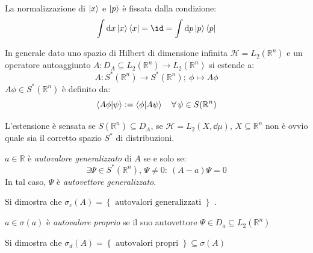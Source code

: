 \begin{remark}
    La normalizzazione di \(\ket{x}\) e \(\ket{p}\) è fissata dalla condizione:
    \begin{equation}
        \int \dd{x} \ket{x}\bra{x} = \id = \int \dd{p} \ket{p}\bra{p}
    \end{equation}

\end{remark}

In generale dato uno spazio di Hilbert di dimensione infinita \(\mathcal{H}= L_2(\mathbb{R}^n)\) e un operatore autoaggiunto \(A: D_A \subseteq L_2(\mathbb{R}^n)\to L_2(\mathbb{R}^n)\)
si estende a:
\begin{equation}
    A: S^*(\mathbb{R}^n)\to S^*(\mathbb{R}^n) ; \ \phi \mapsto A\phi
\end{equation}
\(A\phi \in S^*(\mathbb{R}^n)\) è definito da:
\[
    \braket{A\phi}{\psi}:=\braket{\phi}{A\psi} \quad \forall\, \psi \in S(\mathbb{R}^n)
\]
\begin{attention}
    L'estensione è sensata se \(S(\mathbb{R}^n)\subseteq D_A\), se \(\mathcal{H}= L_2(X, \dd{\mu}), \, X \subseteq \mathbb{R}^n \) non è ovvio 
    quale sia il corretto spazio \(S^*\) di distribuzioni.
\end{attention}
\begin{definition}
    \(a \in \mathbb{R}\) è \textit{autovalore generalizzato} di \(A\) se e solo se:
    \[
        \exists\Psi \in S^*(\mathbb{R}^n), \,\Psi\neq 0 : \ (A-a)\Psi= 0
    \]
    In tal caso, \(\Psi\) è \textit{autovettore generalizzato}.
\end{definition}

Si dimostra che \(\sigma_c(A) = \left\{ \text{ autovalori generalizzati } \right\}\) .
\begin{definition}
    \(a \in \sigma(a)\) è \textit{autovalore proprio} se il suo autovettore \(\Psi \in D_a\subseteq L_2(\mathbb{R}^n)\)
\end{definition}

Si dimostra che \(\sigma_d(A)= \left\{ \text{ autovalori propri } \right\} \subseteq \sigma(A)\)

